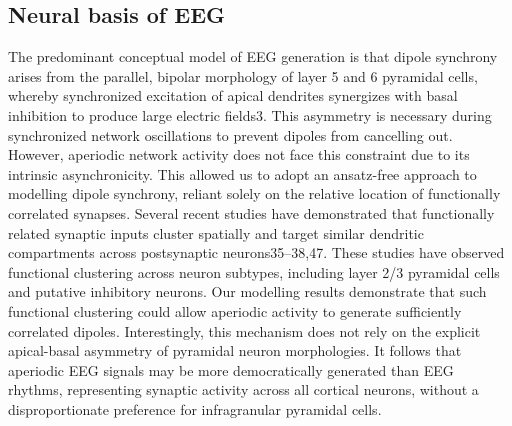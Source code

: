 \subsection{Neural basis of EEG}
The predominant conceptual model of EEG generation is that dipole synchrony arises from the parallel, bipolar morphology of layer 5 and 6 pyramidal cells, whereby synchronized excitation of apical dendrites synergizes with basal inhibition to produce large electric fields3. This asymmetry is necessary during synchronized network oscillations to prevent dipoles from cancelling out. However, aperiodic network activity does not face this constraint due to its intrinsic asynchronicity. This allowed us to adopt an ansatz-free approach to modelling dipole synchrony, reliant solely on the relative location of functionally correlated synapses. Several recent studies have demonstrated that functionally related synaptic inputs cluster spatially and target similar dendritic compartments across postsynaptic neurons35–38,47. These studies have observed functional clustering across neuron subtypes, including layer 2/3 pyramidal cells and putative inhibitory neurons. Our modelling results demonstrate that such functional clustering could allow aperiodic activity to generate sufficiently correlated dipoles. Interestingly, this mechanism does not rely on the explicit apical-basal asymmetry of pyramidal neuron morphologies. It follows that aperiodic EEG signals may be more democratically generated than EEG rhythms, representing synaptic activity across all cortical neurons, without a disproportionate preference for infragranular pyramidal cells. 

